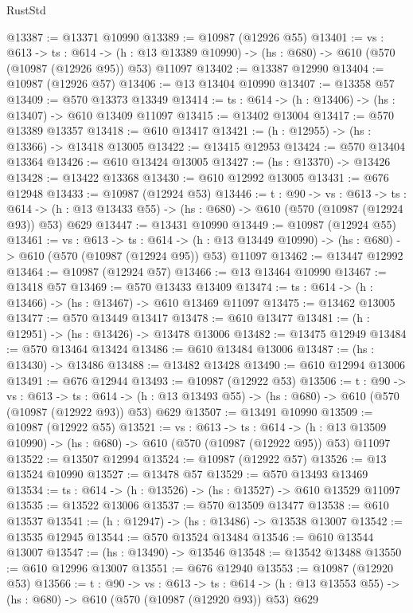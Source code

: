 \begin{lexlean}{RustStd}
\begin{coremodule}
@13387 := @13371 @10990
@13389 := @10987 (@12926 @55)
@13401 := {vs : @613} ->
  {ts : @614} ->
  (h : @13 @13389 @10990) -> (hs : @680) -> @610 (@570 (@10987 (@12926 @95)) @53) @11097
@13402 := @13387 @12990
@13404 := @10987 (@12926 @57)
@13406 := @13 @13404 @10990
@13407 := @13358 @57
@13409 := @570 @13373 @13349
@13414 := {ts : @614} -> (h : @13406) -> (hs : @13407) -> @610 @13409 @11097
@13415 := @13402 @13004
@13417 := @570 @13389 @13357
@13418 := @610 @13417
@13421 := (h : @12955) -> (hs : @13366) -> @13418 @13005
@13422 := @13415 @12953
@13424 := @570 @13404 @13364
@13426 := @610 @13424 @13005
@13427 := (hs : @13370) -> @13426
@13428 := @13422 @13368
@13430 := @610 @12992 @13005
@13431 := @676 @12948
@13433 := @10987 (@12924 @53)
@13446 := {t : @90} ->
  {vs : @613} ->
  {ts : @614} -> (h : @13 @13433 @55) -> (hs : @680) -> @610 (@570 (@10987 (@12924 @93)) @53) @629
@13447 := @13431 @10990
@13449 := @10987 (@12924 @55)
@13461 := {vs : @613} ->
  {ts : @614} ->
  (h : @13 @13449 @10990) -> (hs : @680) -> @610 (@570 (@10987 (@12924 @95)) @53) @11097
@13462 := @13447 @12992
@13464 := @10987 (@12924 @57)
@13466 := @13 @13464 @10990
@13467 := @13418 @57
@13469 := @570 @13433 @13409
@13474 := {ts : @614} -> (h : @13466) -> (hs : @13467) -> @610 @13469 @11097
@13475 := @13462 @13005
@13477 := @570 @13449 @13417
@13478 := @610 @13477
@13481 := (h : @12951) -> (hs : @13426) -> @13478 @13006
@13482 := @13475 @12949
@13484 := @570 @13464 @13424
@13486 := @610 @13484 @13006
@13487 := (hs : @13430) -> @13486
@13488 := @13482 @13428
@13490 := @610 @12994 @13006
@13491 := @676 @12944
@13493 := @10987 (@12922 @53)
@13506 := {t : @90} ->
  {vs : @613} ->
  {ts : @614} -> (h : @13 @13493 @55) -> (hs : @680) -> @610 (@570 (@10987 (@12922 @93)) @53) @629
@13507 := @13491 @10990
@13509 := @10987 (@12922 @55)
@13521 := {vs : @613} ->
  {ts : @614} ->
  (h : @13 @13509 @10990) -> (hs : @680) -> @610 (@570 (@10987 (@12922 @95)) @53) @11097
@13522 := @13507 @12994
@13524 := @10987 (@12922 @57)
@13526 := @13 @13524 @10990
@13527 := @13478 @57
@13529 := @570 @13493 @13469
@13534 := {ts : @614} -> (h : @13526) -> (hs : @13527) -> @610 @13529 @11097
@13535 := @13522 @13006
@13537 := @570 @13509 @13477
@13538 := @610 @13537
@13541 := (h : @12947) -> (hs : @13486) -> @13538 @13007
@13542 := @13535 @12945
@13544 := @570 @13524 @13484
@13546 := @610 @13544 @13007
@13547 := (hs : @13490) -> @13546
@13548 := @13542 @13488
@13550 := @610 @12996 @13007
@13551 := @676 @12940
@13553 := @10987 (@12920 @53)
@13566 := {t : @90} ->
  {vs : @613} ->
  {ts : @614} -> (h : @13 @13553 @55) -> (hs : @680) -> @610 (@570 (@10987 (@12920 @93)) @53) @629

\end{coremodule}
\end{lexlean}

